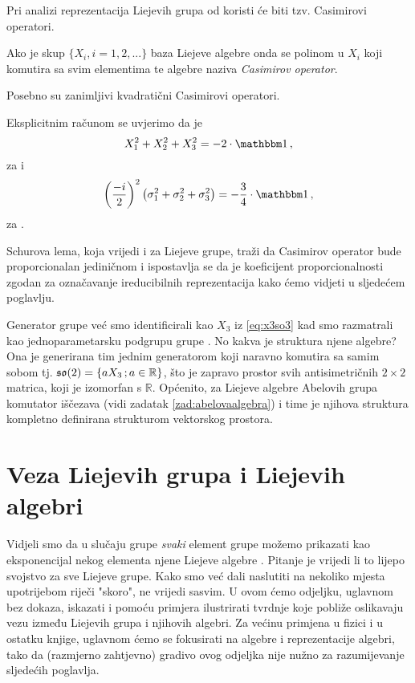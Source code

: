 Pri analizi reprezentacija Liejevih grupa od koristi će biti
tzv. Casimirovi operatori.
\begin{definicija}
Ako je skup $\{X_i, i=1,2, ... \}$ baza Liejeve algebre onda se polinom
u $X_i$ koji komutira sa svim elementima te algebre naziva 
\emph{Casimirov operator}.
\end{definicija}
Posebno su zanimljivi kvadratični Casimirovi operatori.
\begin{primjer}
 Eksplicitnim računom se uvjerimo da je 
\begin{equation}
X_{1}^2 + X_{2}^2 + X_{3}^2 = -2\cdot \Eins \,,
\end{equation}
    za  i
\begin{equation}
    \left(\frac{-i}{2}\right)^2
    \big(\sigma_{1}^2 + \sigma_{2}^2 + \sigma_{3}^2\big) = -\frac{3}{4} \cdot \Eins \,,
\end{equation}
    za .
\end{primjer}
Schurova lema, koja vrijedi i za Liejeve grupe, traži da Casimirov operator 
bude proporcionalan jediničnom i ispostavlja se da je koeficijent proporcionalnosti
zgodan za označavanje ireducibilnih reprezentacija kako ćemo vidjeti u sljedećem poglavlju.


\begin{primjer}
    Generator grupe  već smo identificirali kao $X_3$ iz
    \ref{eq:x3so3} kad smo 
    razmatrali kao jednoparametarsku podgrupu grupe .
    No kakva je struktura njene algebre? Ona je generirana tim
    jednim generatorom koji naravno komutira sa samim sobom
    tj. $\mathfrak{so}(2) = \{ aX_{3}\,; a \in \mathbb{R} \}$, što je
    zapravo prostor svih antisimetričnih $2\times 2$ matrica,
    koji je izomorfan s $\mathbb{R}$.
    Općenito, za Liejeve algebre Abelovih grupa komutator iščezava 
    (vidi zadatak \ref{zad:abelovaalgebra}) i time
    je njihova struktura kompletno definirana strukturom vektorskog
    prostora. \label{pr:so2Alg}
\end{primjer}


\section{Veza Liejevih grupa i Liejevih algebri}

Vidjeli smo da u slučaju grupe  
\emph{svaki} element grupe možemo prikazati kao eksponencijal nekog
elementa njene Liejeve algebre .
Pitanje je vrijedi li to lijepo svojstvo za sve Liejeve grupe.
Kako smo već dali naslutiti na nekoliko mjesta upotrijebom riječi "skoro",
ne vrijedi sasvim. U ovom ćemo odjeljku, uglavnom
bez dokaza, iskazati i pomoću primjera ilustrirati tvrdnje koje 
pobliže oslikavaju vezu između Liejevih grupa i njihovih algebri.
Za većinu primjena u fizici i u ostatku knjige, uglavnom ćemo
se fokusirati na algebre i reprezentacije algebri, tako da (razmjerno
zahtjevno) gradivo ovog odjeljka nije nužno za razumijevanje sljedećih
poglavlja.

